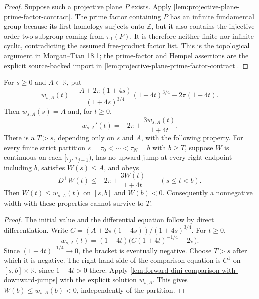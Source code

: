 \begin{proof}
Suppose such a projective plane $P$ exists.  Apply
\ref{lem:projective-plane-prime-factor-contract}.  The prime factor
containing $P$ has an infinite fundamental group because its first homology
surjects onto $\mathbb Z$, but it also contains the injective order-two
subgroup coming from $\pi _1(P)$.  It is therefore neither finite nor
infinite cyclic, contradicting the assumed free-product factor list.  This
is the topological argument in Morgan--Tian 18.1; the prime-factor and
Hempel assertions are the explicit source-backed import in
\ref{lem:projective-plane-prime-factor-contract}.
\end{proof}

\begin{lemma}
\label{lem:scalar-width-lifetime-bound}
\leanok
For $s\ge0$ and $A\in\mathbb R$, put
\[
 w_{s,A}(t)=
 \frac{A+2\pi(1+4s)}{(1+4s)^{3/4}}(1+4t)^{3/4}-2\pi(1+4t).
\]
Then $w_{s,A}(s)=A$ and, for $t\ge0$,
\[
 w_{s,A}'(t)=-2\pi+\frac{3w_{s,A}(t)}{1+4t}.
\]
There is a $T>s$, depending only on $s$ and $A$, with the following property.
For every finite strict partition $s=\tau_0<\cdots<\tau_N=b$ with $b\ge T$,
suppose $W$ is continuous on each $[\tau_j,\tau_{j+1})$, has no upward
jump at every right endpoint including $b$, satisfies $W(s)\le A$, and obeys
\[
 D^+W(t)\le-2\pi+\frac{3W(t)}{1+4t}\qquad(s\le t<b).
\]
Then $W(t)\le w_{s,A}(t)$ on $[s,b]$ and $W(b)<0$.
Consequently a nonnegative width with these properties cannot survive to $T$.
\end{lemma}

\begin{proof}
The initial value and the differential equation follow by direct
differentiation.  Write $C=(A+2\pi(1+4s))/(1+4s)^{3/4}$.  For $t\ge0$,
\[
 w_{s,A}(t)=(1+4t)\bigl(C(1+4t)^{-1/4}-2\pi\bigr).
\]
Since $(1+4t)^{-1/4}\to0$, the bracket is eventually negative.  Choose
$T>s$ after which it is negative.  The right-hand side of the comparison
equation is $C^1$ on $[s,b]\times\mathbb R$, since $1+4t>0$ there.
Apply \ref{lem:forward-dini-comparison-with-downward-jumps} with the
explicit solution $w_{s,A}$.  This gives
$W(b)\le w_{s,A}(b)<0$, independently of the partition.
\end{proof}

